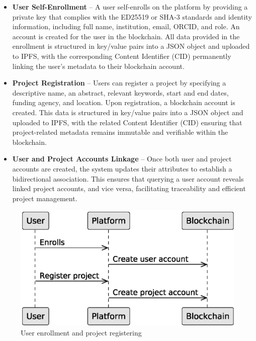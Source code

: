 \documentclass[final]{rc-book-2.14}
\begin{document}
\begin{itemize}
    \item \textbf{User Self-Enrollment} – A user self-enrolls on the platform by providing a private key that complies with the ED25519 or SHA-3 standards and identity information, including full name, institution, email, ORCID, and role. An account is created for the user in the blockchain. All data provided in the enrollment is structured in key/value pairs into a JSON object and uploaded to IPFS, with the corresponding Content Identifier (CID) permanently linking the user’s metadata to their blockchain account.

    \item \textbf{Project Registration} – Users can register a project by specifying a descriptive name, an abstract, relevant keywords, start and end dates, funding agency, and location. Upon registration, a blockchain account is created. This data is structured in key/value pairs into a JSON object and uploaded to IPFS, with the related Content Identifier (CID) ensuring that project-related metadata remains immutable and verifiable within the blockchain.

    \item \textbf{User and Project Accounts Linkage} – Once both user and project accounts are created, the system updates their attributes to establish a bidirectional association. This ensures that querying a user account reveals linked project accounts, and vice versa, facilitating traceability and efficient project management.
\end{itemize}


\begin{figure}[htbp]
    \centering
    \includegraphics[scale=0.5]{fig/c4_platform_operations_1.eps}
    \caption{User enrollment and project registering}
    \label{fig:c4_operations_1}
\end{figure}
\end{document}
